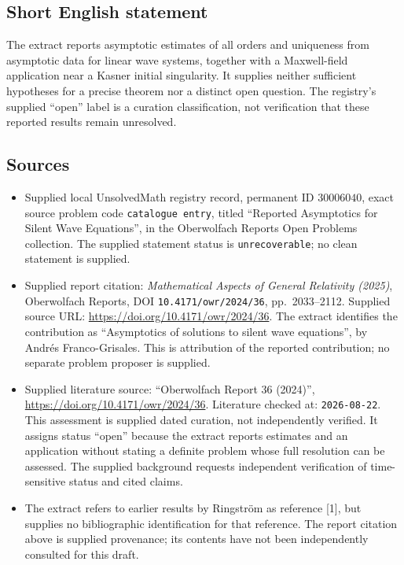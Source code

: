 \documentclass[11pt]{article}
\begin{document}
\subsection{Short English statement}
The extract reports asymptotic estimates of all orders and uniqueness from asymptotic data for linear wave systems, together with a Maxwell-field application near a Kasner initial singularity. It supplies neither sufficient hypotheses for a precise theorem nor a distinct open question. The registry's supplied ``open'' label is a curation classification, not verification that these reported results remain unresolved.
\subsection{Sources}
\begin{itemize}
\item Supplied local UnsolvedMath registry record, permanent ID \(30006040\), exact source problem code \texttt{catalogue entry}, titled ``Reported Asymptotics for Silent Wave Equations'', in the Oberwolfach Reports Open Problems collection. The supplied statement status is \texttt{unrecoverable}; no clean statement is supplied.
\item Supplied report citation: \emph{Mathematical Aspects of General Relativity (2025)}, Oberwolfach Reports, DOI \texttt{10.4171/owr/2024/36}, pp.\ 2033--2112. Supplied source URL: \url{https://doi.org/10.4171/owr/2024/36}. The extract identifies the contribution as ``Asymptotics of solutions to silent wave equations'', by Andr\'es Franco-Grisales. This is attribution of the reported contribution; no separate problem proposer is supplied.
\item Supplied literature source: ``Oberwolfach Report 36 (2024)'', \url{https://doi.org/10.4171/owr/2024/36}. Literature checked at: \texttt{2026-08-22}. This assessment is supplied dated curation, not independently verified. It assigns status ``open'' because the extract reports estimates and an application without stating a definite problem whose full resolution can be assessed. The supplied background requests independent verification of time-sensitive status and cited claims.
\item The extract refers to earlier results by Ringstr\"om as reference [1], but supplies no bibliographic identification for that reference. The report citation above is supplied provenance; its contents have not been independently consulted for this draft.
\end{itemize}
\end{document}
